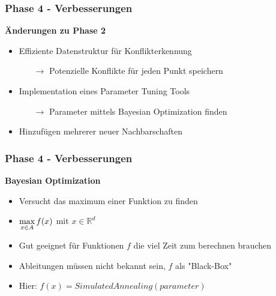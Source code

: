\documentclass[aspectratio=169]{beamer}
\begin{document}

\begin{frame}
\frametitle{Phase 4 - Verbesserungen}
\textbf{Änderungen zu Phase 2}\\
\begin{itemize}
	\item Effiziente Datenstruktur für Konflikterkennung
	\begin{itemize}
		\item[$\rightarrow$] Potenzielle Konflikte für jeden Punkt speichern
	\end{itemize}
	\item Implementation eines Parameter Tuning Tools
	\begin{itemize}
		\item[$\rightarrow$] Parameter mittels Bayesian Optimization finden
	\end{itemize}
	\item Hinzufügen mehrerer neuer Nachbarschaften
\end{itemize}
\end{frame}


\begin{frame}
\frametitle{Phase 4 - Verbesserungen}
\textbf{Bayesian Optimization}\\
\begin{itemize}
	\item Versucht das maximum einer Funktion zu finden
	\item $\underset{x \in A}{\max} \thinspace f(x)$ mit $x \in \mathbb{R}^d$
	\item Gut geeignet für Funktionen $f$ die viel Zeit zum berechnen brauchen
	\item Ableitungen müssen nicht bekannt sein, $f$ als "Black-Box"
	\item Hier: $f(x) = SimulatedAnnealing(parameter) $
\end{itemize}
\end{frame}

\end{document}
